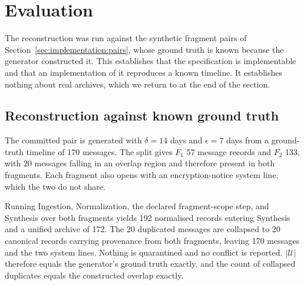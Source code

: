 
\section{Evaluation}
\label{sec:evaluation}

The reconstruction was run against the synthetic fragment pairs of
Section~\ref{sec:implementation:pairs}, whose ground truth is known because the
generator constructed it. This establishes that the specification is
implementable and that an implementation of it reproduces a known timeline. It
establishes nothing about real archives, which we return to at the end of the
section.

\subsection{Reconstruction against known ground truth}
\label{sec:evaluation:reconstruction}

The committed pair is generated with $\delta = 14$ days and $\epsilon = 7$ days
from a ground-truth timeline of 170 messages. The split gives $F_1$ 57 message
records and $F_2$ 133, with 20 messages falling in an overlap region and
therefore present in both fragments. Each fragment also opens with an
encryption-notice system line, which the two do not share.

Running Ingestion, Normalization, the declared fragment-scope step, and Synthesis
over both fragments yields 192 normalised records entering Synthesis and a
unified archive of 172. The 20 duplicated messages are collapsed to 20 canonical
records carrying provenance from both fragments, leaving 170 messages and the two
system lines. Nothing is quarantined and no conflict is reported.
$|\mathcal{U}|$ therefore equals the generator's ground truth exactly, and the
count of collapsed duplicates equals the constructed overlap exactly.

